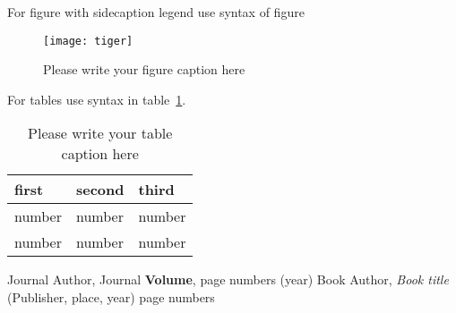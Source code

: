 \documentclass{webofc}
\begin{document}
For figure with sidecaption legend use syntax of figure
\begin{figure}
\centering
\sidecaption
\texttt{[image: tiger]}
\caption{Please write your figure caption here}
\label{fig-3}       %
\end{figure}

For tables use syntax in table~\ref{tab-1}.
\begin{table}
\centering
\caption{Please write your table caption here}
\label{tab-1}       %
\begin{tabular}{lll}
\hline
first & second & third  \\\hline
number & number & number \\
number & number & number \\\hline
\end{tabular}
\vspace*{5cm}  %
\end{table}
%
% 
%
%
\begin{thebibliography}{}
%
%
Journal Author, Journal \textbf{Volume}, page numbers (year)
Book Author, \textit{Book title} (Publisher, place, year) page numbers
\end{thebibliography}
\end{document}
